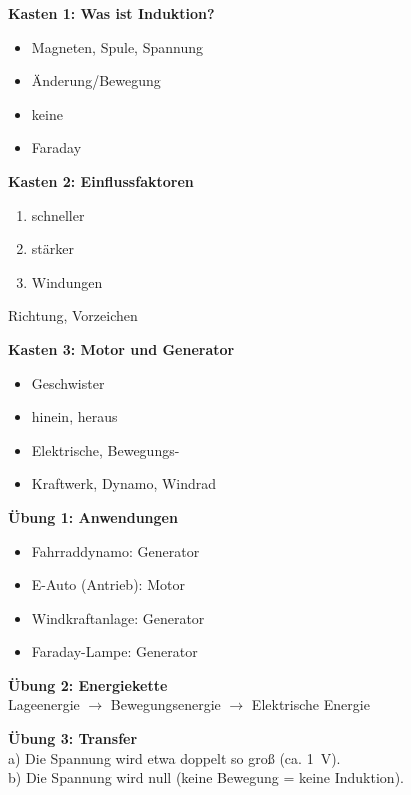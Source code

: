 \documentclass[a4paper,11pt]{article}
\begin{document}
\begin{successbox}

\textbf{Kasten 1: Was ist Induktion?}
\begin{itemize}[noitemsep]
    \item Magneten, Spule, Spannung
    \item Änderung/Bewegung
    \item keine
    \item Faraday
\end{itemize}

\textbf{Kasten 2: Einflussfaktoren}
\begin{enumerate}[noitemsep]
    \item schneller
    \item stärker
    \item Windungen
\end{enumerate}
Richtung, Vorzeichen

\textbf{Kasten 3: Motor und Generator}
\begin{itemize}[noitemsep]
    \item Geschwister
    \item hinein, heraus
    \item Elektrische, Bewegungs-
    \item Kraftwerk, Dynamo, Windrad
\end{itemize}

\textbf{Übung 1: Anwendungen}
\begin{itemize}[noitemsep]
    \item Fahrraddynamo: Generator
    \item E-Auto (Antrieb): Motor
    \item Windkraftanlage: Generator
    \item Faraday-Lampe: Generator
\end{itemize}

\textbf{Übung 2: Energiekette}\\
Lageenergie $\rightarrow$ Bewegungsenergie $\rightarrow$ Elektrische Energie

\textbf{Übung 3: Transfer}\\
a) Die Spannung wird etwa doppelt so groß (ca. 1~V).\\
b) Die Spannung wird null (keine Bewegung = keine Induktion).

\end{successbox}

\vspace{5mm}
\end{document}
